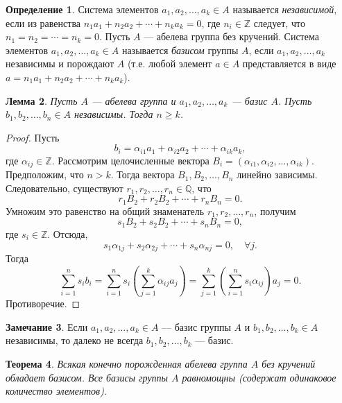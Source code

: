 \documentclass[12pt, titlepage, oneside]{amsbook}
\newcommand{\ZZ}{\mathbb{Z}}
\newcommand{\QQ}{\mathbb{Q}}
\newtheorem{theorem}{Теорема}[chapter]
\newtheorem{lemma}[theorem]{Лемма}
\theoremstyle{definition}
\newtheorem{definition}[theorem]{Определение}
\newtheorem{remark}[theorem]{Замечание}
\theoremstyle{remark}
\begin{document}
\begin{definition}
	Система элементов $a_1,a_2,\ldots, a_k\in A$ называется \emph{независимой}, если из равенства $n_1a_1+n_2a_2+\cdots+n_k a_k=0$, где $n_i\in\ZZ$ следует, что $n_1=n_2=\cdots=n_k=0$. Пусть $A$ --- абелева группа без кручений. Система элементов $a_1,a_2,\ldots, a_k\in A$ называется \emph{базисом} группы $A$, если $a_1,a_2,\ldots, a_k$ независимы и порождают $A$ (т.е. любой элемент $a\in A$ представляется в виде $a=n_1a_1+n_2a_2+\cdots+n_k a_k$).
\end{definition}

\begin{lemma}
	\label{SvGr1} Пусть $A$ --- абелева группа и $a_1,a_2,\ldots, a_k$ --- базис $A$. Пусть $b_1,b_2,\ldots, b_n\in A$ независимы. Тогда $n\geq k$.
\end{lemma}

\begin{proof}
	Пусть $$b_i=\alpha_{i1} a_1+\alpha_{i2} a_2+\cdots+\alpha_{ik}a_k,$$ где $\alpha_{ij}\in\ZZ$. Рассмотрим целочисленные вектора $B_i=(\alpha_{i1},\alpha_{i2},\ldots,\alpha_{ik})$. Предположим, что $n>k$. Тогда вектора $B_1,B_2,\ldots, B_n$ линейно зависимы. Следовательно, существуют $r_1,r_2,\ldots, r_n\in\QQ$, что $$r_1B_2+r_2B_2+\cdots+r_nB_n=0.$$ Умножим это равенство на общий знаменатель $r_1,r_2,\ldots, r_n$, получим $$s_1B_2+s_2B_2+\cdots+s_nB_n=0,$$ где $s_i\in\ZZ$. Отсюда, $$s_1\alpha_{1j}+s_2\alpha_{2j}+\cdots+s_n\alpha_{nj}=0,\quad\forall j.$$ Тогда $$\sum\limits_{i=1}^n s_i b_i=\sum\limits_{i=1}^n s_i\left(\sum\limits_{j=1}^k\alpha_{ij} a_j\right)=\sum\limits_{j=1}^k\left(\sum\limits_{i=1}^n s_i\alpha_{ij}\right)a_j=0.$$ Противоречие.
\end{proof}

\begin{remark}
	Если $a_1,a_2,\ldots, a_k\in A$ --- базис группы $A$ и $b_1,b_2,\ldots, b_k\in A$ независимы, то далеко не всегда $b_1,b_2,\ldots, b_k$ --- базис.
\end{remark}

\begin{theorem}
	\label{SvGr2} Всякая конечно порожденная абелева группа $A$ без кручений обладает базисом. Все базисы группы $A$ равномощны (содержат одинаковое количество элементов).
\end{theorem}
\end{document}
